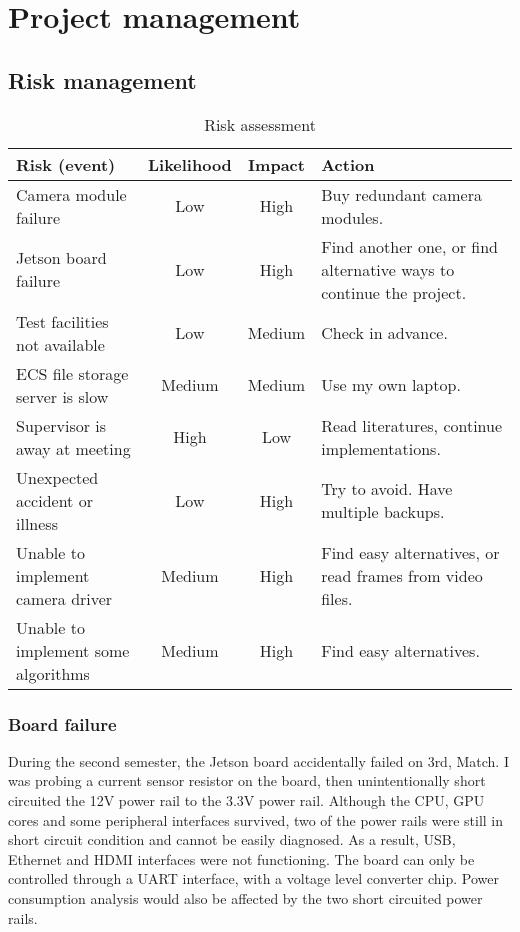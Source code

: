 \chapter{Project management}

\section{Risk management}

\begin{table}[!htb]
  \centering
  \begin{tabular}{|p{}|c|c|p{}|}
  \hline
  \textbf{Risk (event)} & \textbf{Likelihood} & \textbf{Impact} & \textbf{Action} \\ \hline
  Camera module failure & Low & High & Buy redundant camera modules. \\ \hline
  Jetson board failure & Low & High & Find another one, or find alternative ways to continue the project. \\ \hline
  Test facilities not available & Low & Medium & Check in advance. \\ \hline
  ECS file storage server is slow & Medium & Medium & Use my own laptop. \\ \hline
  Supervisor is away at meeting & High & Low & Read literatures, continue implementations. \\ \hline
  Unexpected accident or illness & Low & High & Try to avoid. Have multiple backups. \\ \hline
  Unable to implement camera driver & Medium & High & Find easy alternatives, or read frames from video files. \\ \hline
  Unable to implement some algorithms & Medium & High & Find easy alternatives. \\ \hline
  \end{tabular}
  \caption{Risk assessment}
  \label{man:risk}
\end{table}

\subsection{Board failure}

During the second semester, the Jetson board accidentally failed on 3rd, Match. I was probing a current sensor resistor on the board, then unintentionally short circuited the 12V power rail to the 3.3V power rail. Although the CPU, GPU cores and some peripheral interfaces survived, two of the power rails were still in short circuit condition and cannot be easily diagnosed. As a result, USB, Ethernet and HDMI interfaces were not functioning. The board can only be controlled through a UART interface, with a voltage level converter chip. Power consumption analysis would also be affected by the two short circuited power rails.

